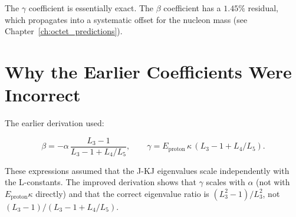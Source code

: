 The \(\gamma\) coefficient is essentially exact.  The \(\beta\) coefficient
has a \(1.45\%\) residual, which propagates into a systematic offset for
the nucleon mass (see Chapter~\ref{ch:octet_predictions}).

\section{Why the Earlier Coefficients Were Incorrect}

The earlier derivation used:

\[
\beta = -\alpha\,\frac{L_3 - 1}{L_3 - 1 + L_4/L_5},
\qquad
\gamma = E_{\text{proton}}\,\kappa\,(L_3 - 1 + L_4/L_5).
\]

These expressions assumed that the J-KJ eigenvalues scale independently
with the L-constants.  The improved derivation shows that \(\gamma\)
scales with \(\alpha\) (not with \(E_{\text{proton}}\kappa\) directly)
and that the correct eigenvalue ratio is \((L_3^2 - 1)/L_3^2\), not
\((L_3-1)/(L_3-1+L_4/L_5)\).
